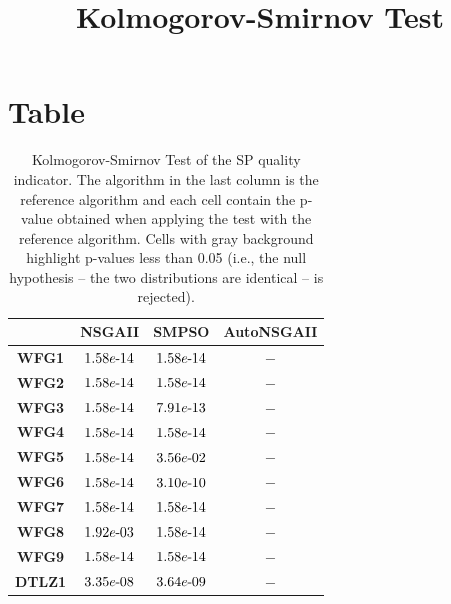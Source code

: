 \documentclass{article}
\title{Kolmogorov-Smirnov Test}
\author{}
\begin{document}
\maketitle
\section{Table}
\begin{table}[!htp]
  \caption{Kolmogorov-Smirnov Test of the SP quality indicator. The algorithm in the last column is the reference algorithm and each cell contain the p-value obtained when applying the test with the reference algorithm. Cells with gray background highlight p-values less than 0.05 (i.e., the null hypothesis -- the two distributions are identical -- is rejected).}
  \label{table:SP}
  \centering
  \begin{tiny}
  \begin{tabular}{c|ccc}
      & \textbf{NSGAII} & \textbf{SMPSO} & \textbf{AutoNSGAII} \\\hline
\textbf{WFG1} & $\cellcolor{gray25} 1.58e\makebox[0.1cm]{-}14 $ & $ \cellcolor{gray25} 1.58e\makebox[0.1cm]{-}14 $ & $ -$ \\
\textbf{WFG2} & $\cellcolor{gray25} 1.58e\makebox[0.1cm]{-}14 $ & $ \cellcolor{gray25} 1.58e\makebox[0.1cm]{-}14 $ & $ -$ \\
\textbf{WFG3} & $\cellcolor{gray25} 1.58e\makebox[0.1cm]{-}14 $ & $ \cellcolor{gray25} 7.91e\makebox[0.1cm]{-}13 $ & $ -$ \\
\textbf{WFG4} & $\cellcolor{gray25} 1.58e\makebox[0.1cm]{-}14 $ & $ \cellcolor{gray25} 1.58e\makebox[0.1cm]{-}14 $ & $ -$ \\
\textbf{WFG5} & $\cellcolor{gray25} 1.58e\makebox[0.1cm]{-}14 $ & $ \cellcolor{gray25} 3.56e\makebox[0.1cm]{-}02 $ & $ -$ \\
\textbf{WFG6} & $\cellcolor{gray25} 1.58e\makebox[0.1cm]{-}14 $ & $ \cellcolor{gray25} 3.10e\makebox[0.1cm]{-}10 $ & $ -$ \\
\textbf{WFG7} & $\cellcolor{gray25} 1.58e\makebox[0.1cm]{-}14 $ & $ \cellcolor{gray25} 1.58e\makebox[0.1cm]{-}14 $ & $ -$ \\
\textbf{WFG8} & $\cellcolor{gray25} 1.92e\makebox[0.1cm]{-}03 $ & $ \cellcolor{gray25} 1.58e\makebox[0.1cm]{-}14 $ & $ -$ \\
\textbf{WFG9} & $\cellcolor{gray25} 1.58e\makebox[0.1cm]{-}14 $ & $ \cellcolor{gray25} 1.58e\makebox[0.1cm]{-}14 $ & $ -$ \\
\textbf{DTLZ1} & $\cellcolor{gray25} 3.35e\makebox[0.1cm]{-}08 $ & $ \cellcolor{gray25} 3.64e\makebox[0.1cm]{-}09 $ & $ -$ \\

\end{tabular}
\end{tiny}
\end{table}
\end{document}
